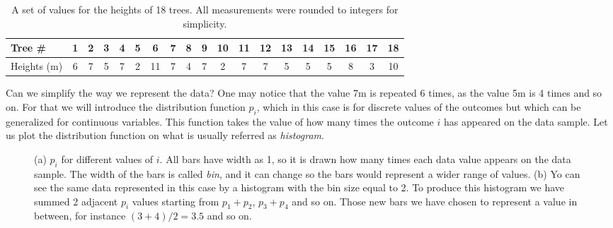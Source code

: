 \begin{table}
\begin{center}
\begin{tabular}{| l | c | c | c | c | c | c | c | c | c | c | c | c | c | c | c | c | c | c | }
  \hline
  Tree \# & 1 & 2 & 3 & 4 & 5 & 6 & 7 & 8 & 9 & 10 &  11 &  12 &  13 &  14 &  15 &  16 &  17 &  18
  \\ \hline
  Heights (m) & 6 &  7 &  5 &  7 &  2 & 11 &  7 &  4 &  7 &  2 &  7 &  7 &  5 &  5 &  5 &  8 &  3 & 10 \\ \hline
\end{tabular}
\end{center}
\caption{A set of values for the heights of 18 trees. All measurements were rounded to integers for simplicity.}
\end{table}

Can we simplify the way we represent the data?
One may notice that the value 7m is repeated 6 times, as the value 5m is 4 times and so on.
For that we will introduce the distribution function $p_i$, which in this case is for discrete values of the outcomes but which can be generalized for continuous variables.
This function takes the value of how many times the outcome $i$ has appeared on the data sample.
Let us plot the distribution function on what is usually referred as \emph{histogram}.

\begin{figure}
  \centering
  \hfill
  \caption{\baselineskip=14pt (a) $p_i$ for different values of $i$. All bars have width as 1, so it is drawn how many times each data value appears on the data sample.
  The width of the bars is called \emph{bin}, and it can change so the bars would represent a wider range of values. (b) Yo can see the same data represented in this case by a histogram with the bin size equal to 2. To produce this histogram we have summed 2 adjacent $p_i$ values starting from $p_1+p_2$, $p_3+p_4$ and so on.
  Those new bars we have chosen to represent a value in between, for instance $(3+4)/2=3.5$ and so on.}
\end{figure}

